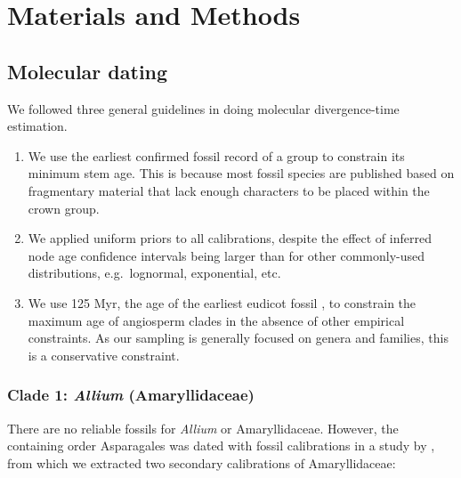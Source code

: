 \documentclass[10pt]{article}
\begin{document}
\raggedright
\parindent 0.5in



\clearpage
\newpage

\section*{Materials and Methods}

\subsection*{Molecular dating}

We followed three general guidelines in doing molecular
divergence-time estimation.

\begin{enumerate}

\item We use the earliest confirmed fossil record of a group to
  constrain its minimum stem age. This is because most fossil species
  are published based on fragmentary material that lack enough
  characters to be placed within the crown group.

\item We applied uniform priors to all calibrations, despite the
  effect of inferred node age confidence intervals being larger than
  for other commonly-used distributions, e.g.\ lognormal, exponential,
  etc.%

\item We use 125 Myr, the age of the earliest eudicot fossil
  \citep{Hughes1994}, to constrain the maximum age of angiosperm
  clades in the absence of other empirical constraints. As our
  sampling is generally focused on genera and families, this is a
  conservative constraint.

\end{enumerate}

\subsubsection*{Clade 1: \textit{Allium} (Amaryllidaceae)}

There are no reliable fossils for \textit{Allium} or
Amaryllidaceae. However, the containing order Asparagales was dated
with fossil calibrations in a study by \citet{Chen2013}, from which we
extracted two secondary calibrations of Amaryllidaceae:
\end{document}
